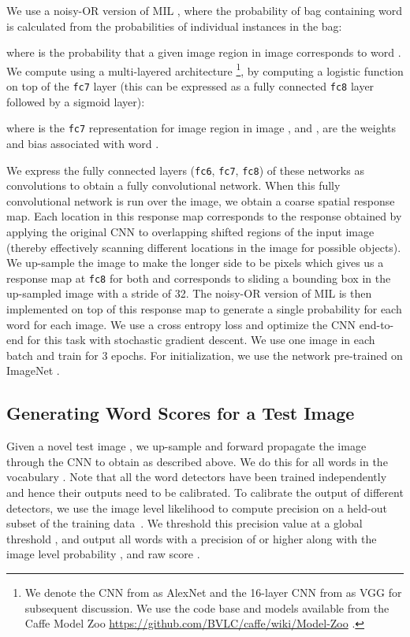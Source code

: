 \documentclass[10pt,twocolumn,letterpaper]{article}
\begin{document}
We use a noisy-OR version of MIL \cite{zhangNIPS05}, where the probability of bag  containing word  is calculated from the probabilities of individual instances in the bag:

where  is the probability that a given image region  in image  corresponds to word . We compute  using a multi-layered architecture \cite{krizhevskyNIPS12,simonyan14very}\footnote{We denote the CNN from \cite{krizhevskyNIPS12} as AlexNet and the 16-layer CNN from \cite{simonyan14very} as VGG for subsequent discussion. We use the code base and models available from the Caffe Model Zoo \url{https://github.com/BVLC/caffe/wiki/Model-Zoo} \cite{jia2014caffe}.}, by computing a logistic function on top of the \texttt{fc7} layer (this can be expressed as a fully connected \texttt{fc8} layer followed by a sigmoid layer):

where  is the \texttt{fc7} representation for image region  in image , and ,  are the weights and bias associated with word .

We express the fully connected layers (\texttt{fc6}, \texttt{fc7}, \texttt{fc8}) of these networks as convolutions to obtain a fully convolutional network. When this fully convolutional network is run over the image, we obtain a coarse spatial response map. Each location in this response map corresponds to the response obtained by applying the original CNN to overlapping shifted regions of the input image (thereby effectively scanning different locations in the image for possible objects). We up-sample the image to make the longer side to be  pixels which gives us a  response map at \texttt{fc8} for both \cite{krizhevskyNIPS12,simonyan14very} and corresponds to sliding a  bounding box in the up-sampled image with a stride of 32. The noisy-OR version of MIL is then implemented on top of this response map to generate a single probability  for each word for each image. We use a cross entropy loss and optimize the CNN end-to-end for this task with stochastic gradient descent. We use one image in each batch and train for 3 epochs. For initialization, we use the network pre-trained on ImageNet \cite{imagenet_cvpr09}.

\subsection{Generating Word Scores for a Test Image}\label{sec:detgen}
Given a novel test image , we up-sample and forward propagate the image through the CNN to obtain  as described above. We do this for all words  in the vocabulary . Note that all the word detectors have been trained independently and hence their outputs need to be calibrated. To calibrate the output of different detectors, we use the image level likelihood  to compute precision on a held-out subset of the training data~\cite{hariharanCVPR2014b}. We threshold this precision value at a global threshold , and output all words  with a precision of  or higher along with the image level probability , and raw score .
\end{document}
